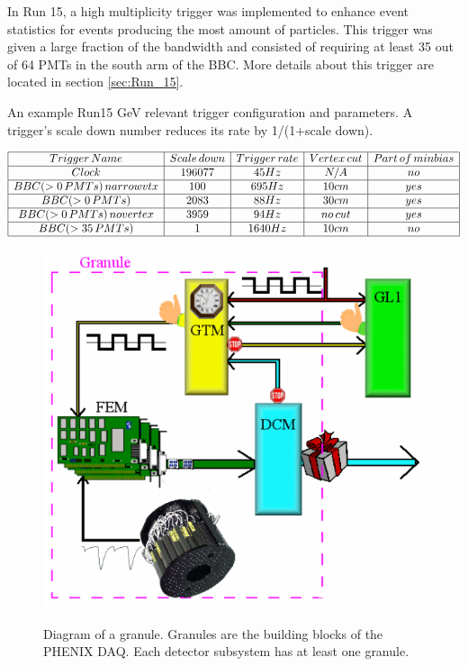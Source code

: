 In Run 15, a high multiplicity trigger was implemented to enhance event statistics for events producing the most amount of particles. This trigger was given a large fraction of the bandwidth and consisted of requiring at least 35 out of 64 PMTs in the south arm of the BBC. More details about this trigger are located in section \ref{sec:Run_15}.
\begin{table}[h!]
\centering
\caption{An example Run15  GeV relevant trigger configuration and parameters. A trigger's scale down number reduces its rate by 1/(1+scale down). }%
    $\begin{array}{|c|c|c|c|c|}
    \hline 
    Trigger\thinspace Name & Scale\thinspace down & Trigger\thinspace rate & Vertex\thinspace cut & Part\thinspace of\thinspace minbias \\ \hline
     Clock & 196077 & 45 Hz  & N/A & no \\ \hline
    BBC(>0\thinspace PMTs)\thinspace narrowvtx& 100 &  695 Hz &  10 cm & yes\\ \hline
    BBC(>0\thinspace PMTs)  & 2083 & 88 Hz &  30 cm & yes\\ \hline
    BBC(>0\thinspace PMTs)\thinspace novertex& 3959 &94 Hz  &no\thinspace cut & yes\\ \hline
    BBC(>35\thinspace  PMTs) & 1 & 1640 Hz &  10 cm & no \\ \hline
    \end{array}$
\label{tbl:trigger_config}
\end{table}

\begin{figure}[h!]
\begin{center}
\label{fig:granule_diag}
\includegraphics[width=0.55\linewidth]{figs/granule_diagram.png}
\caption{Diagram of a granule. Granules are the building blocks of the PHENIX DAQ. Each detector subsystem has at least one granule.} %
\end{center}
\end{figure}

